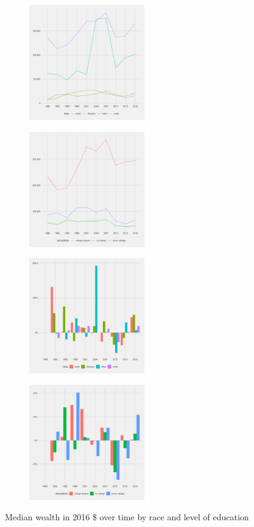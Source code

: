 \documentclass[]{scrartcl}
\begin{document}
\begin{figure}[h]
	\centering
	\begin{subfigure}{.49\textwidth}
		\centering
		\includegraphics[width=\linewidth, height=5cm]{../median wealth finance_survey _by race .png}
	\end{subfigure}
	\begin{subfigure}{.49\textwidth}
	\centering
	\includegraphics[width=\linewidth, height=5cm]{../median wealth finance_survey _by education .png}
	\end{subfigure}
	\begin{subfigure}{.49\textwidth}
	\centering
	\includegraphics[width=\linewidth, height=5cm]{../change_median wealth finance_survey _by race .png}
	\end{subfigure}
	\begin{subfigure}{.49\textwidth}
	\centering
	\includegraphics[width=\linewidth, height=5cm]{../change_median wealth finance_survey _by education .png}
	\end{subfigure}
	\caption{Median wealth in 2016 \$ over time by race and level of education}\label{fig:gen_trends}
\end{figure}
\end{document}
